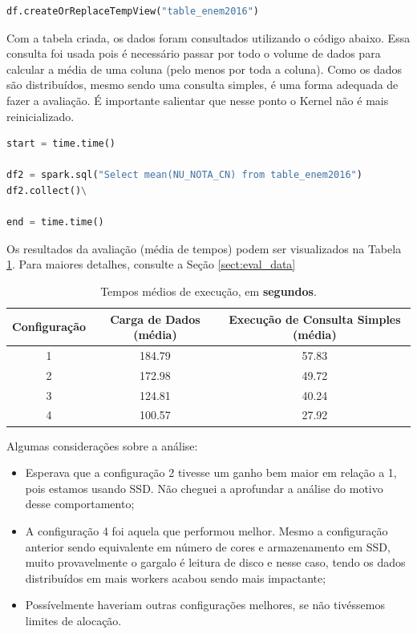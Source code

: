 \documentclass{article}
\begin{document}
\begin{lstlisting}[caption= {Criação da Tabela para Consulta},captionpos=b, language=python]
df.createOrReplaceTempView("table_enem2016")
\end{lstlisting}

Com a tabela criada, os dados foram consultados utilizando o código abaixo. Essa consulta foi usada pois é necessário passar por todo o volume de dados para calcular a média de uma coluna (pelo menos por toda a coluna). Como os dados são distribuídos, mesmo sendo uma consulta simples, é uma forma adequada de fazer a avaliação. É importante salientar que nesse ponto o Kernel não é mais reinicializado.

\begin{lstlisting}[caption= {Consulta Simplificada para Avaliação},captionpos=b, language=python]
start = time.time()

df2 = spark.sql("Select mean(NU_NOTA_CN) from table_enem2016")
df2.collect()\

end = time.time()
\end{lstlisting}

Os resultados da avaliação (média de tempos) podem ser visualizados na Tabela \ref{tab:mean_times}. Para maiores detalhes, consulte a Seção \ref{sect:eval_data}

\begin{table}[H]
\centering
\begin{tabular}{|c|c|c|}
\hline
Configuração & Carga de Dados (média) &  Execução de  Consulta Simples (média) \\ \hline 
\hline
1 & 184.79 &  57.83
\\ \hline
2 & 172.98 & 49.72
 \\ \hline
3 & 124.81
 &  40.24
 \\ \hline
4 & 100.57
 &  27.92
 \\ \hline
\end{tabular}
\caption{Tempos médios de execução, em \textbf{segundos}.}
\label{tab:mean_times}
\end{table}

Algumas considerações sobre a análise:

\begin{itemize}
    \item Esperava que a configuração 2 tivesse um ganho bem maior em relação a 1, pois estamos usando SSD. Não cheguei a aprofundar a análise do motivo desse comportamento;
    \item A configuração 4 foi aquela que performou melhor. Mesmo a configuração anterior sendo equivalente em número de cores e armazenamento em SSD, muito provavelmente o gargalo é leitura de disco e nesse caso, tendo os dados distribuídos em mais workers acabou sendo mais impactante;
    \item Possívelmente haveriam outras configurações melhores, se não tivéssemos limites de alocação.
\end{itemize}
\end{document}
